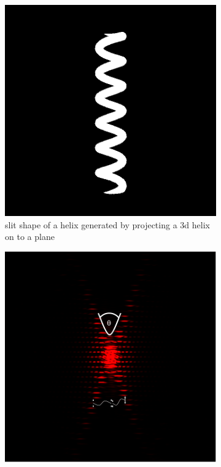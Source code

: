\begin{figure}[H]
    \centering
    \begin{subfigure}{0.48\columnwidth}
        \centering
        \includegraphics[width=\columnwidth]{figures/slit shape.png} %
        \caption{slit shape of a helix generated by projecting a 3d helix on to a plane}
        \label{fig:expansion slit shape}
    \end{subfigure}\hfill
    \begin{subfigure}{0.48\columnwidth}
        \centering
        \includegraphics[width=\columnwidth]{figures/interference pattern.png} %

\end{subfigure}
\end{figure}
